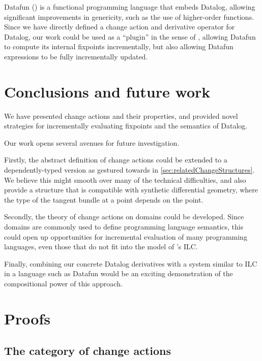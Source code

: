 Datafun (\textcite{arntz2016datafun}) is a functional programming language that embeds
Datalog, allowing significant improvements in genericity, such as the use of
higher-order functions. Since we have directly defined a change action and
derivative operator for Datalog, our work could be used as a ``plugin'' in the sense
of \citeauthor{cai2014changes}, allowing Datafun to compute its internal fixpoints
incrementally, but also allowing Datafun expressions to be fully incrementally updated.

\section{Conclusions and future work}

We have presented change actions and their properties, and provided novel
strategies for incrementally evaluating fixpoints and the semantics of Datalog.

Our work opens several avenues for future investigation.

Firstly, the abstract definition of change actions could be extended to a
dependently-typed version as gestured towards in
\cref{sec:relatedChangeStructures}. We believe this might smooth over many of
the technical difficulties, and also provide a structure that is compatible with
synthetic differential geometry, where the type of the tangent bundle at a point
depends on the point.

Secondly, the theory of change actions on domains could be developed. Since
domains are commonly used to define programming language semantics, this could
open up opportunities for incremental evaluation of many programming languages,
even those that do not fit into the model of \citeauthor{cai2014changes}'s ILC.

Finally, combining our concrete Datalog derivatives with a system similar to ILC
in a language such as Datafun would be an exciting demonstration of the compositional
power of this approach.

\printbibliography

\clearpage
\appendix
\appendixpage
\section{Proofs}

\subsection{The category of change actions}

